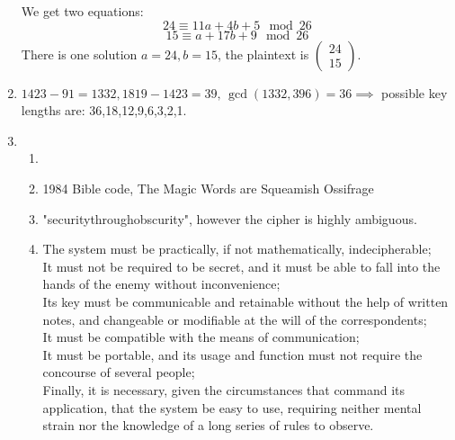 \documentclass[a4paper,10pt]{extarticle}
\begin{document}
\begin{enumerate}
    We get two equations:
    \[
      24\equiv 11a+4b+5 \mod{26}
    \]
    \[
      15\equiv a+17b+9 \mod{26}
    \]
    There is one solution $a=24, b=15$, the plaintext is $\begin{pmatrix}24\\15\end{pmatrix}$.
  \item
    $1423-91=1332, 1819-1423=39,\, \gcd(1332,396)=36 \implies$ possible key lengths are: 36,18,12,9,6,3,2,1.
  \item
    \begin{enumerate}
      \item
      \item
        1984 Bible code, The Magic Words are Squeamish Ossifrage
      \item
        "securitythroughobscurity", however the cipher is highly ambiguous.
      \item
        The system must be practically, if not mathematically, indecipherable;\\
        It must not be required to be secret, and it must be able to fall into the hands of the enemy without inconvenience;\\
        Its key must be communicable and retainable without the help of written notes, and changeable or modifiable at the will of the correspondents;\\
        It must be compatible with the means of communication;\\
        It must be portable, and its usage and function must not require the concourse of several people;\\
        Finally, it is necessary, given the circumstances that command its application, that the system be easy to use, requiring neither mental strain nor the knowledge of a long series of rules to observe.
    \end{enumerate}
\end{enumerate}
\end{document}
